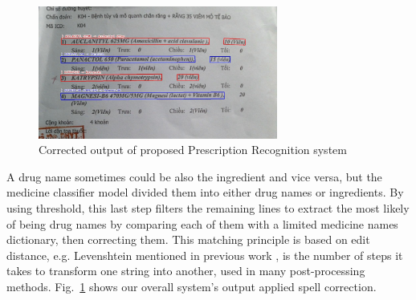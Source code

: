 \begin{figure}
\centering
\includegraphics[width=0.7\textwidth]{method/fuzzy_0.jpg}
\caption{Corrected output of proposed Prescription Recognition system} \label{fig_fuzzy_0}
\end{figure}
A drug name sometimes could be also the ingredient and vice versa, but the medicine classifier model divided them into either drug names or ingredients. By using threshold, this last step filters the remaining lines to extract the most likely of being drug names by comparing each of them with a limited medicine names dictionary, then correcting them. This matching principle is based on edit distance, e.g. Levenshtein mentioned in previous work \cite{nguyen2021developing}, is the number of steps it takes to transform one string into another, used in many post-processing methods. 
Fig.~\ref{fig_fuzzy_0} shows our overall system's output applied spell correction.


